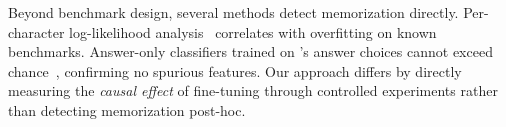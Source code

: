  Beyond benchmark design, several methods detect memorization directly. Per-character log-likelihood analysis~\citep{zhang2024gsm1k} correlates with overfitting on known benchmarks. Answer-only classifiers trained on \gpqa's answer choices cannot exceed chance~\citep{rein2023gpqa}, confirming no spurious features. Our approach differs by directly measuring the \emph{causal effect} of fine-tuning through controlled experiments rather than detecting memorization post-hoc.
